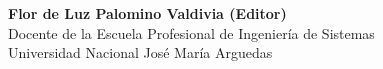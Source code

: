 \begin{center}
\textbf{Flor de Luz Palomino Valdivia (Editor)}\\
Docente de la Escuela Profesional de Ingenierí­a de Sistemas \\
Universidad Nacional José Marí­a Arguedas \\
\end{center}


